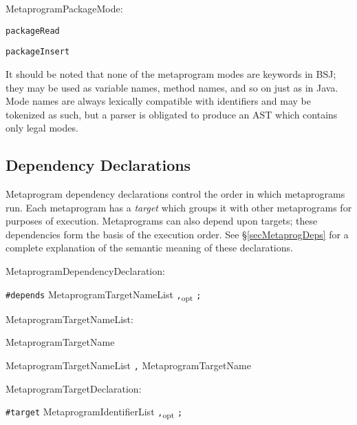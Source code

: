 \documentclass[a4paper,10pt]{report}
\newcommand{\refS}[1]{\hyperref[#1]{\S\ref{#1}}}
\newcommand{\opt}{\textsubscript{opt}}
\newcommand{\vocab}[1]{\textit{#1}}
\newenvironment{grammar}{
    \begin{list}{}{
        \itshape
        \setlength{\partopsep}{\topsep}
        \setlength{\topsep}{0cm}
    }
}{
    \end{list}
}
\begin{document}
\begin{grammar}
    \item MetaprogramPackageMode:
    \begin{grammar}
        \item \verb`packageRead`
        \item \verb`packageInsert`
    \end{grammar}
\end{grammar}


It should be noted that none of the metaprogram modes are keywords in BSJ; they may be used as variable names, method names, and so on just as in Java.  Mode names are always lexically compatible with identifiers and may be tokenized as such, but a parser is obligated to produce an AST which contains only legal modes.

\subsection{Dependency Declarations}
\label{secMetaprogPreambleDeps}

Metaprogram dependency declarations control the order in which metaprograms run.  Each metaprogram has a \vocab{target} which groups it with other metaprograms for purposes of execution.  Metaprograms can also depend upon targets; these dependencies form the basis of the execution order.  See \refS{secMetaprogDeps} for a complete explanation of the semantic meaning of these declarations.

\begin{grammar}
    \item MetaprogramDependencyDeclaration:
    \begin{grammar}
        \item \verb`#depends` MetaprogramTargetNameList \verb`,`\opt{} \verb`;`
    \end{grammar}
\end{grammar}

\begin{grammar}
    \item MetaprogramTargetNameList:
    \begin{grammar}
        \item MetaprogramTargetName
        \item MetaprogramTargetNameList \verb`,` MetaprogramTargetName
    \end{grammar}
\end{grammar}

\begin{grammar}
    \item MetaprogramTargetDeclaration:
    \begin{grammar}
        \item \verb`#target` MetaprogramIdentifierList \verb`,`\opt{} \verb`;`
    \end{grammar}
\end{grammar}
\end{document}
